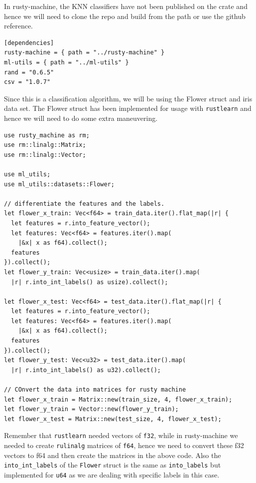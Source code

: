 \documentclass{book}
\begin{document}
In rusty-machine, the KNN classifiers have not been published on the crate and hence we will need to clone the repo and build from the path or use the github reference.

\begin{lstlisting}[caption={chapter2\\/rusty\_machine\_classification\\/Cargo\\.toml}]
[dependencies]
rusty-machine = { path = "../rusty-machine" }
ml-utils = { path = "../ml-utils" }
rand = "0.6.5"
csv = "1.0.7"
\end{lstlisting}

Since this is a classification algorithm, we will be using the Flower struct and iris data set. The Flower struct has been implemented for usage with \lstinline{rustlearn} and hence we will need to do some extra maneuvering.

\begin{lstlisting}[caption={chapter2\\/rusty\_machine\_classification\\/Cargo\\.toml}]
use rusty_machine as rm;
use rm::linalg::Matrix;
use rm::linalg::Vector;

use ml_utils;
use ml_utils::datasets::Flower;

// differentiate the features and the labels.
let flower_x_train: Vec<f64> = train_data.iter().flat_map(|r| {
  let features = r.into_feature_vector();
  let features: Vec<f64> = features.iter().map(
    |&x| x as f64).collect();
  features
}).collect();
let flower_y_train: Vec<usize> = train_data.iter().map(
  |r| r.into_int_labels() as usize).collect();

let flower_x_test: Vec<f64> = test_data.iter().flat_map(|r| {
  let features = r.into_feature_vector();
  let features: Vec<f64> = features.iter().map(
    |&x| x as f64).collect();
  features
}).collect();
let flower_y_test: Vec<u32> = test_data.iter().map(
  |r| r.into_int_labels() as u32).collect();

// COnvert the data into matrices for rusty machine
let flower_x_train = Matrix::new(train_size, 4, flower_x_train);
let flower_y_train = Vector::new(flower_y_train);
let flower_x_test = Matrix::new(test_size, 4, flower_x_test);
\end{lstlisting}

Remember that \lstinline{rustlearn} needed vectors of \lstinline{f32}, while in rusty-machine we needed to create \lstinline{rulinalg} matrices of \lstinline{f64}, hence we need to convert these f32 vectors to f64 and then create the matrices in the above code. Also the \lstinline{into_int_labels} of the \lstinline{Flower} struct is the same as \lstinline{into_labels} but implemented for \lstinline{u64} as we are dealing with specific labels in this case.
\end{document}
